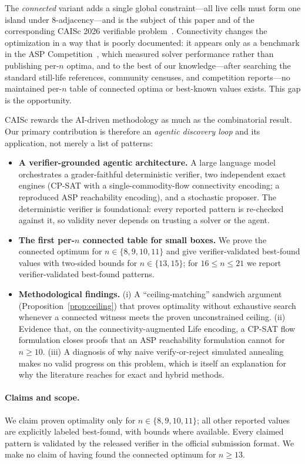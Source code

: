 \documentclass{article}
\begin{document}
The \emph{connected} variant adds a single global constraint---all live cells must form one island under $8$-adjacency---and is the subject of this paper and of the corresponding CAISc 2026 verifiable problem~\citep{problem}. Connectivity changes the optimization in a way that is poorly documented: it appears only as a benchmark in the ASP Competition~\citep{aspcomp2013}, which measured solver performance rather than publishing per-$n$ optima, and to the best of our knowledge---after searching the standard still-life references, community censuses, and competition reports---no maintained per-$n$ table of connected optima or best-known values exists. This gap is the opportunity.

CAISc rewards the AI-driven methodology as much as the combinatorial result. Our primary contribution is therefore an \emph{agentic discovery loop} and its application, not merely a list of patterns:

\begin{itemize}
\item \textbf{A verifier-grounded agentic architecture.} A large language model orchestrates a grader-faithful deterministic verifier, two independent exact engines (CP-SAT with a single-commodity-flow connectivity encoding; a reproduced ASP reachability encoding), and a stochastic proposer. The deterministic verifier is foundational: every reported pattern is re-checked against it, so validity never depends on trusting a solver or the agent.
\item \textbf{The first per-$n$ connected table for small boxes.} We prove the connected optimum for $n\in\{8,9,10,11\}$ and give verifier-validated best-found values with two-sided bounds for $n\in\{13,15\}$; for $16\le n\le 21$ we report verifier-validated best-found patterns.
\item \textbf{Methodological findings.} (i) A ``ceiling-matching'' sandwich argument (Proposition~\ref{prop:ceiling}) that proves optimality without exhaustive search whenever a connected witness meets the proven unconstrained ceiling. (ii) Evidence that, on the connectivity-augmented Life encoding, a CP-SAT flow formulation closes proofs that an ASP reachability formulation cannot for $n\ge 10$. (iii) A diagnosis of why naive verify-or-reject simulated annealing makes no valid progress on this problem, which is itself an explanation for why the literature reaches for exact and hybrid methods.
\end{itemize}

\paragraph{Claims and scope.} We claim proven optimality only for $n\in\{8,9,10,11\}$; all other reported values are explicitly labeled best-found, with bounds where available. Every claimed pattern is validated by the released verifier in the official submission format. We make no claim of having found the connected optimum for $n\ge 13$.
\end{document}
